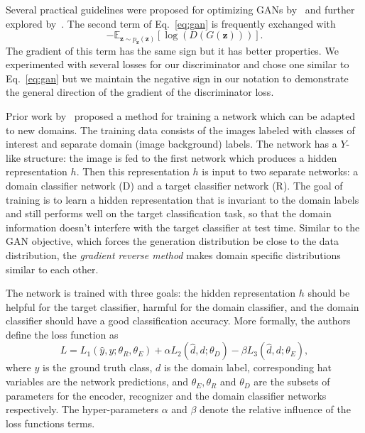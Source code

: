 \documentclass[a4paper]{article}
\begin{document}
    Several practical guidelines were proposed for optimizing GANs by~\cite{radford2015unsupervised} and 
    further explored by~\cite{salimans2016improved}. The second term of Eq.~\ref{eq:gan}
    is frequently exchanged with
    \begin{equation}
        - \mathbb{E}_{\bm{z} \sim p_{\bm{z}}(\bm{z})}[\log (D(G(\bm{z})))].
    \end{equation}
    The gradient of this term has the same sign but it has better properties.
    We experimented with several losses for our discriminator and chose one
    similar to Eq.~\ref{eq:gan} but we maintain the negative sign in our notation
    to demonstrate the general direction of the gradient of the discriminator loss.
    
    Prior work by~\cite{ganin2014unsupervised} proposed a method for training a network 
    which can be adapted to new domains. The training data consists of the images
    labeled with classes of interest and separate domain (image background) labels. 
    The network has a $Y$-like structure: the image is fed to the
    first network which produces a hidden representation $h$. Then this 
    representation $h$ is input to two separate networks: a domain classifier network (D) and 
    a target classifier network (R). The goal of training is to learn a hidden 
    representation that is invariant to the domain labels and still performs well on 
    the target classification task, so that the domain information doesn't 
    interfere with the target classifier at test time. Similar to the GAN 
    objective, which forces the generation distribution be close to the data distribution,
    the \emph{gradient reverse method} makes domain specific distributions similar to each other.

    The network is trained with three goals: the hidden representation $h$ should
    be helpful for the target classifier, harmful for the domain classifier,
    and the domain classifier should have a good classification accuracy. More 
    formally, the authors define the loss function as
    \begin{equation}
        L = L_1(\hat{y}, y; \theta_R, \theta_E) + 
        \alpha L_2(\hat{d}, d; \theta_D) -
        \beta L_3(\hat{d}, d; \theta_E),
        \label{eq:grm}
    \end{equation}
    where $y$ is the ground truth class, $d$ is the domain label, corresponding
    hat variables are the network predictions, and $\theta_E, \theta_R$ and 
    $\theta_D$ are the subsets of  parameters for the encoder,
    recognizer and the domain classifier networks respectively. The hyper-parameters
    $\alpha$ and $\beta$ denote the relative influence of the loss functions terms.
\end{document}
